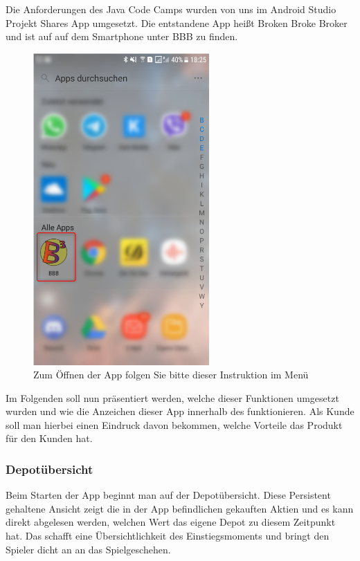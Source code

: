 \documentclass[10pt]{scrartcl}
\begin{document}
Die Anforderungen des Java Code Camps wurden von uns im Android Studio Projekt Shares App umgesetzt. Die entstandene App heißt Broken Broke Broker und ist auf auf dem Smartphone unter BBB zu finden.

\begin{figure}[H]
	\centering
	\includegraphics[width=0.6\textwidth]{Bilder/Prsi/StartenDerApp.png}
	\caption{Zum Öffnen der App folgen Sie bitte dieser Instruktion im Menü}
\end{figure}

Im Folgenden soll nun präsentiert werden, welche dieser Funktionen umgesetzt wurden und wie die Anzeichen dieser App innerhalb des funktionieren. Als Kunde soll man hierbei einen Eindruck davon bekommen, welche Vorteile das Produkt für den Kunden hat. 

\subsubsection{Depotübersicht}
Beim Starten der App beginnt man auf der Depotübersicht. Diese Persistent gehaltene Ansicht zeigt die in der App befindlichen gekauften Aktien und es kann direkt abgelesen werden, welchen Wert das eigene Depot zu diesem Zeitpunkt hat. Das schafft eine Übersichtlichkeit des Einstiegsmoments und bringt den Spieler dicht an an das Spielgeschehen.
\end{document}
